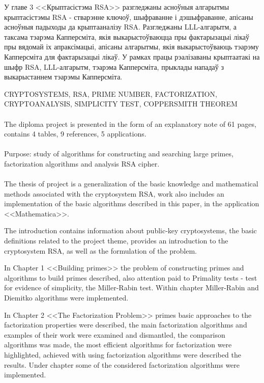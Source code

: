 У главе 3 <<Крыптасістэма RSA>> разгледжаны асноўныя алгарытмы крыптасістэмы RSA - стварэнне ключоў, шыфраванне і дэшыфраванне, апісаны асноўныя
падыходы да крыптааналізу RSA. Разгледжаны LLL-алгарытм, а таксама тэарэма Капперсміта, якія выкарыстоўваюцца пры фактарызацыі лікаў пры вядомай іх
апраксімацыі, апісаны алгарытмы, якія выкарыстоўваюць тэарэму Капперсміта для фактарызацыі лікаў. У рамках працы рэалізаваны крыптаатакі на шыфр RSA, LLL-алгарытм, тэарэма Капперсміта, прыклады нападаў з выкарыстаннем тэарэмы Капперсміта.

\newpage

CRYPTOSYSTEMS, RSA, PRIME NUMBER, FACTORIZATION, CRYPTO\-ANALYSIS, SIMPLICITY TEST, COPPERSMITH THEOREM

\paragraph{} The diploma project is presented in the form of an explanatory note of 61 pages, contains 4 tables, 9 references, 5 applications.

\paragraph{} Purpose: study of algorithms for constructing and searching large primes, factori\-zation algorithms and analysis RSA cipher.

\paragraph{} The thesis of project is a generalization of the basic knowledge and mathematical methods associated with the cryptosystem RSA, work also includes an implemen\-tation of the basic algorithms described in this paper, in the application <<Mathema\-tica>>.

The introduction contains information about public-key cryptosystems, the basic definitions related to the project theme,
provides an introduction to the cryptosystem RSA, as well as the formulation of the problem.

In Chapter 1 <<Building primes>> the problem of constructing primes and algorithms to build primes described,
also attention paid to Primality tests - test for evidence of simplicity, the Miller-Rabin test. Within
chapter Miller-Rabin and Diemitko algorithms were implemented.

In Chapter 2 <<The Factorization Problem>> primes basic approaches to the factorization properties were described, the main factorization algorithms and examples of their work were examined and dismantled, the comparison algorithms was made, the most efficient algorithms for factorization were highlighted, achieved with using factorization algorithms were described the results. Under chapter some of the considered factorization algorithms were implemented.

